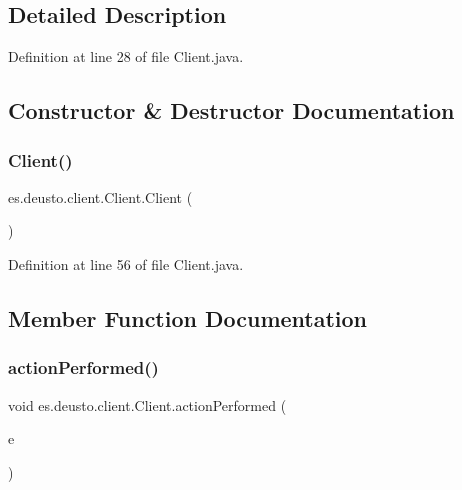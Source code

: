 \subsection{Detailed Description}


Definition at line 28 of file Client.\+java.



\subsection{Constructor \& Destructor Documentation}
\mbox{\label{classes_1_1deusto_1_1client_1_1_client_a71c03e318a72447da873297f3364f67f}} 
\subsubsection{\texorpdfstring{Client()}{Client()}}
{\footnotesize\ttfamily es.\+deusto.\+client.\+Client.\+Client (\begin{DoxyParamCaption}{ }\end{DoxyParamCaption})}



Definition at line 56 of file Client.\+java.



\subsection{Member Function Documentation}
\mbox{\label{classes_1_1deusto_1_1client_1_1_client_a57eb7a5154b4b1559430f90a1c1df852}} 
\subsubsection{\texorpdfstring{action\+Performed()}{actionPerformed()}}
{\footnotesize\ttfamily void es.\+deusto.\+client.\+Client.\+action\+Performed (\begin{DoxyParamCaption}\item[{Action\+Event}]{e }\end{DoxyParamCaption})}



